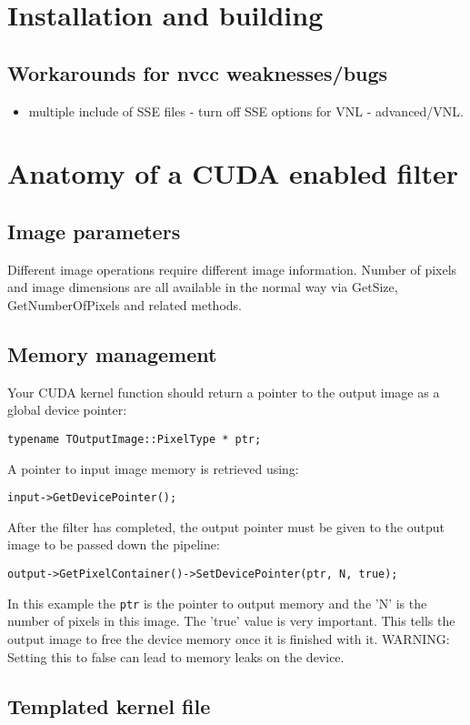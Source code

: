 \documentclass{InsightArticle}
\begin{document}
\section{Installation and building}
\subsection{Workarounds for nvcc weaknesses/bugs}
\begin{itemize}
  \item multiple include of SSE files - turn off SSE options for VNL - advanced/VNL.
\end{itemize}




\section{Anatomy of a CUDA enabled filter}
\subsection{Image parameters}
Different image operations require different image information. Number
of pixels and image dimensions are all available in the normal way via
GetSize, GetNumberOfPixels and related methods.

\subsection{Memory management}

Your CUDA kernel function should return a pointer to the output image as a global device pointer:

{\tt typename TOutputImage::PixelType * ptr;}

A pointer to input image memory is retrieved using:

{\tt input->GetDevicePointer();}

After the filter has completed, the output pointer must be given to
the output image to be passed down the pipeline:

{\tt output->GetPixelContainer()->SetDevicePointer(ptr, N, true);}

In this example the {\tt ptr} is the pointer to output memory and the 'N'
is the number of pixels in this image. The 'true' value is very
important. This tells the output image to free the device memory once
it is finished with it. WARNING: Setting this to false can lead to
memory leaks on the device.



\subsection{Templated kernel file}



%

\nocite{ITKSoftwareGuide}
\end{document}
